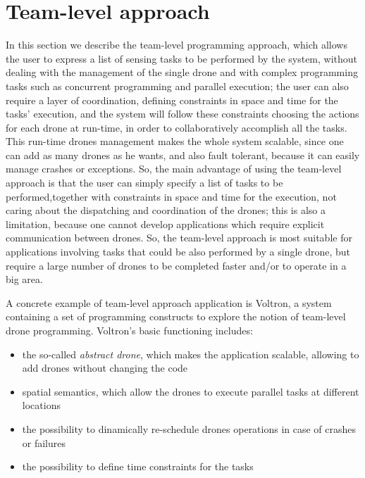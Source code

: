 \section {Team-level approach}\label{teamlevel}

In this section we describe the team-level programming approach, which allows the user to express a list of sensing tasks to be performed by the system, without dealing with the management of the single drone and with complex programming tasks such as concurrent programming and parallel execution; the user can also require a layer of coordination, defining constraints in space and time for the tasks' execution, and the system will follow these constraints choosing the actions for each drone at run-time, in order to collaboratively accomplish all the tasks.
This run-time drones management makes the whole system scalable, since one can add as many drones as he wants, and also fault tolerant, because it can easily manage crashes or exceptions.
So, the main advantage of using the team-level approach is that the user can simply specify a list of tasks to be performed,together with constraints in space and time for the execution, not caring about the dispatching and coordination of the drones; this is also a limitation, because one cannot develop applications which require explicit communication between drones.
So, the team-level approach is most suitable for applications involving tasks that could be also performed by a single drone, but require a large number of drones to be completed faster and/or to operate in a big area.


A concrete example of team-level approach application is Voltron\cite{voltron}, a system containing a set of programming constructs to explore the notion of team-level drone programming. 
Voltron's\cite{voltron} basic functioning includes:

\begin{itemize}
\itemsep2pt
\item{
the so-called \textit{abstract drone}, which makes the application scalable, allowing to add drones without changing the code
}
\item{spatial semantics, which allow the drones to execute parallel tasks at different locations
}
\item{
the possibility to dinamically re-schedule drones operations in case of crashes or failures
}
\item{
the possibility to define time constraints for the tasks 
}
\end{itemize}

